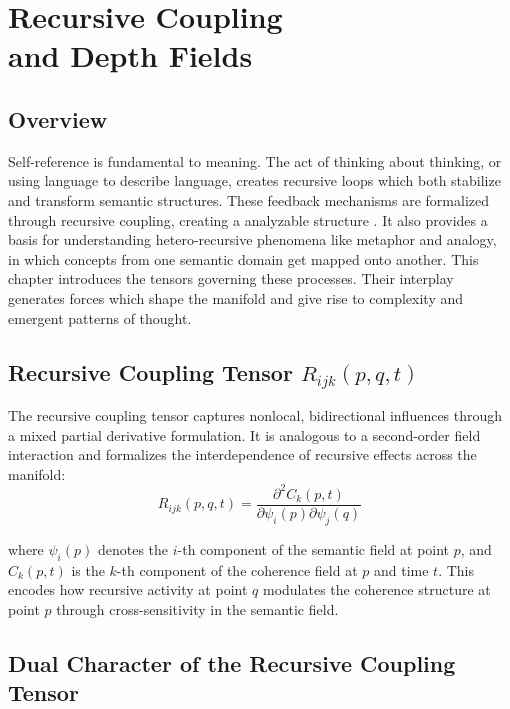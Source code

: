 \chapter{Recursive Coupling \\ and Depth Fields}

\section{Overview}

Self-reference is fundamental to meaning. The act of thinking about thinking, or using language to describe language, creates recursive loops which both stabilize and transform semantic structures. These feedback mechanisms are formalized through recursive coupling, creating a analyzable structure \autocite{Barabasi2016}. It also provides a basis for understanding hetero-recursive phenomena like metaphor and analogy, in which concepts from one semantic domain get mapped onto another. This chapter introduces the tensors governing these processes. Their interplay generates forces which shape the manifold and give rise to complexity and emergent patterns of thought.

\section{\texorpdfstring{Recursive Coupling Tensor $R_{ijk}(p, q, t)$}{Recursive Coupling Tensor R_ijk(p, q, t)}}

The recursive coupling tensor captures nonlocal, bidirectional influences through a mixed partial derivative formulation. It is analogous to a second-order field interaction and formalizes the interdependence of recursive effects across the manifold:
\begin{equation}
R_{ijk}(p, q, t) = \frac{\partial^2 C_k(p,t)}{\partial \psi_i(p) \partial \psi_j(q)}
\end{equation}

where \(\psi_i(p)\) denotes the \(i\)-th component of the semantic field at point \(p\), and \(C_k(p,t)\) is the \(k\)-th component of the coherence field at \(p\) and time \(t\). This encodes how recursive activity at point \(q\) modulates the coherence structure at point \(p\) through cross-sensitivity in the semantic field.

\section{Dual Character of the Recursive Coupling Tensor}

